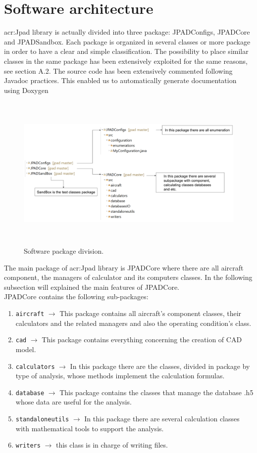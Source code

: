 \section{Software architecture}

\gls{acr:Jpad} library is actually divided into three package: JPADConfigs, JPADCore and JPADSandbox.  Each package is organized in several classes or more package in order to have a clear and simple classification. The possibility to place similar classes in the same package has been extensively exploited for the same reasons, see section A.2.   The source code has been extensively commented following Javadoc practices. This enabled us to automatically generate documentation using Doxygen \cite{doxgen}

\begin{figure}[H]
	\centering
	\includegraphics[height = 7.6cm ]{Immagini/organization}
	\caption{Software package division.}
	\label{fig:sw}
\end{figure}
 
 The main package of \gls{acr:Jpad} library is JPADCore where there are all aircraft component, the managers of calculator and  its computers classes. In the following subsection will explained the main features of JPADCore.\\
 JPADCore contains the following sub-packages:
 \begin{enumerate}
 \item \texttt{aircraft} $\rightarrow$ This package contains all aircraft's component classes, their calculators and the related managers and also the operating condition's class.
 \item \texttt{cad} $\rightarrow$  This package contains everything concerning the creation of CAD model.
 \item \texttt{calculators} $\rightarrow$ In this package there are the classes, divided in package by type of analysis, whose methods implement the calculation formulas.
 \item \texttt{database} $\rightarrow$ This package contains the classes that manage the database .h5 whose data are useful for the analysis. 
 \item \texttt{standaloneutils} $\rightarrow$ In this package there are several calculation classes with mathematical tools to support the analysis.
 \item \texttt{writers} $\rightarrow$ this class is in charge of writing files.
 \end{enumerate}
 
